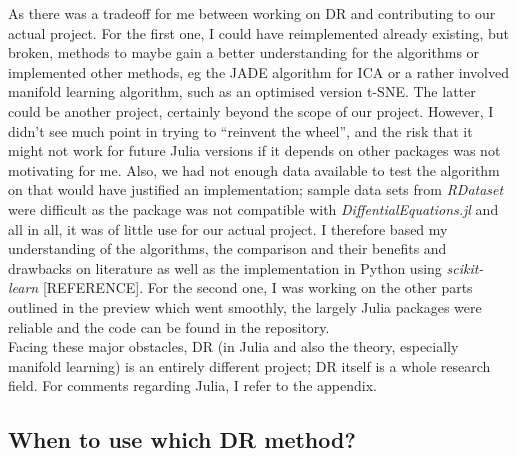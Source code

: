 \documentclass[journal, a4paper]{IEEEtran}
\begin{document}
As there was a tradeoff for me between working on DR and contributing to our actual project. 
For the first one, I could have reimplemented already existing, but broken, methods to maybe gain a better understanding for the algorithms or implemented other methods, eg the JADE algorithm for ICA or a rather involved manifold learning algorithm, such as an optimised version t-SNE. The latter could be another project, certainly beyond the scope of our project. However, I didn’t see much point in trying to “reinvent the wheel”, and the risk that it might not work for future Julia versions if it depends on other packages was not motivating for me. Also, we had not enough data available to test the algorithm on that would have justified an implementation; sample data sets from \textit{RDataset} were difficult as the package was not compatible with \textit{DiffentialEquations.jl} and all in all, it was of little use for our actual project. I therefore based my understanding of the algorithms, the comparison and their benefits and drawbacks on literature as well as the implementation in Python using \textit{scikit-learn} [REFERENCE].
For the second one, I was working on the other parts outlined in the preview which went smoothly, the largely Julia packages were reliable and the code can be found in the repository. \\

Facing these major obstacles, DR (in Julia and also the theory, especially manifold learning) is an entirely different project; DR itself is a whole research field. For comments regarding Julia, I refer to the appendix. \\


\subsection{When to use which DR method?}
\end{document}
